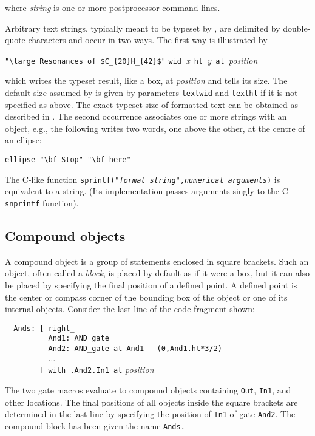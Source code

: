 \noindent where {\sl string} is one or more postprocessor command lines.

Arbitrary text strings, typically meant to be typeset by \latex, are
delimited by double-quote characters and occur in two ways.  The first
way is illustrated by

\verb|"\large Resonances of $C_{20}H_{42}$"|
 \verb|wid |{\sl x}\verb| ht |{\sl y}\verb| at |{\sl position}

\noindent
which writes the typeset result, like a box, at {\sl position} and tells
\pic its size.  The default size assumed by \pic is given by parameters
{\tt textwid} and {\tt textht} if it is not specified as above.
The exact typeset size of formatted text can be obtained
as described in .  The second occurrence
associates one or more strings with an object, e.g., the following writes
two words, one above the other, at the centre of an ellipse:

\verb|ellipse "\bf Stop" "\bf here"|

\noindent
The C-like \pic function
 {\tt sprintf("{\sl format string}",{\sl numerical arguments})}
is equivalent to a string.
(Its implementation passes arguments singly to the C {\tt snprintf}
function).

\subsection{Compound objects\label{Compoundobjects:}}
A compound object is a group of statements enclosed in square
brackets.  Such an object, often called a {\em block},
is placed by default as if it were a box, but
it can also be placed by specifying the final position of a defined point.
A defined point is the center or compass corner of the bounding box
of the object or one of its internal objects.
Consider the last line of the code fragment shown:

\noindent%
\verb|  Ands: [ right_|\\
\verb|          And1: AND_gate|\\
\verb|          And2: AND_gate at And1 - (0,And1.ht*3/2)|\\
\verb|          |$\ldots$\\
\verb|        ] with .And2.In1 at| {\sl position} %

The two gate macros evaluate to compound objects containing {\tt Out},
{\tt In1}, and other locations.  The final positions of all objects
inside the square brackets are determined in the last line by
specifying the position of {\tt In1} of gate {\tt And2}.
The compound block has been given the name {\tt Ands.}


